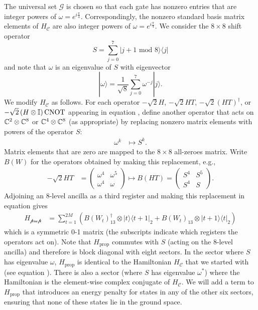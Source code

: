 \documentclass[../thesis-main/thesis-main]{subfiles}
\begin{document}
The universal set $\mathcal{G}$ is chosen so that each gate has nonzero entries that are integer powers of $\omega=e^{i\frac{\pi}{4}}$.  Correspondingly, the nonzero standard basis matrix elements of $H_{\mathcal{C}}$ are also integer powers of $\omega=e^{i\frac{\pi}{4}}$. We consider the $8\times8$ shift operator
\begin{equation}
  S=\sum_{j=0}^{7}|j+1\text{ mod 8}\rangle\langle j|
\end{equation}
and note that $\omega$ is an eigenvalue of $S$ with eigenvector
\begin{equation}
  |\omega\rangle=\frac{1}{\sqrt{8}}\sum_{j=0}^{7}\omega^{-j}|j\rangle.
\end{equation}
We modify $H_{\mathcal{C}}$ as follows. For each operator $-\sqrt{2}H$, $-\sqrt{2}HT$, $-\sqrt{2}(HT)^{\dagger}$, or $-\sqrt{2}\left(H\otimes\mathbb{I}\right)\mathrm{CNOT}$ appearing in equation , define another operator that acts on $\mathbb{C}^{2}\otimes\mathbb{C}^{8}$ or $\mathbb{C}^{4}\otimes\mathbb{C}^{8}$ (as appropriate) by replacing nonzero matrix elements with powers of the operator $S$:
\begin{align}
  \omega^{k} &\mapsto S^{k}.
\end{align}
Matrix elements that are zero are mapped to the $8\times8$ all-zeroes matrix. Write $B(W)$ for the operators obtained by making this replacement, e.g., 
\begin{align}
-\sqrt{2}HT & = \begin{pmatrix}
\omega^{4} & \omega^{5}\\
\omega^{4} & \omega
\end{pmatrix} \mapsto B(HT)=\begin{pmatrix}
S^{4} & S^{5}\\
S^{4} & S
\end{pmatrix}.
\end{align}
Adjoining an 8-level ancilla as a third register and making this replacement in equation  gives 
\begin{align}
H_{\mathcal{\text{prop}}} & =\sum_{t=1}^{2M}\left(B(W_{t})^{\dagger}_{13}\otimes|t\rangle\langle t+1|_2+B(W_{t})_{13}\otimes|t+1\rangle\langle t|_2\right)\label{eq:Hprop-1}
\end{align}
which is a symmetric $0$-1 matrix (the subscripts indicate which registers the operators act on). Note that $H_{\text{prop}}$ commutes with $S$ (acting on the $8$-level ancilla) and therefore is block diagonal with eight sectors. In the sector where $S$ has eigenvalue $\omega$, $H_{\text{prop}}$ is identical to the Hamiltonian $H_{\mathcal{C}}$ that we started with (see equation ). There is also a sector (where $S$ has eigenvalue $\omega^*$) where the Hamiltonian is the element-wise complex conjugate of $H_{\mathcal{C}}$. We will add a term to $H_{\text{prop}}$ that introduces an energy penalty for states in any of the other six sectors, ensuring that none of these states lie in the ground space.
\end{document}
